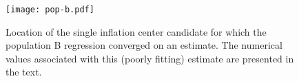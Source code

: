 \begin{figure}
    \texttt{[image: pop-b.pdf]}%
    \caption[Population B: single center estimate]{Location of the single inflation center candidate for which the population B regression converged on an estimate. The numerical values associated with this (poorly fitting) estimate are presented in the text.}%
    \label{fig:pop-b}
\end{figure}

